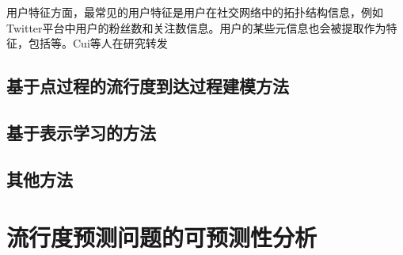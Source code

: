 用户特征方面，最常见的用户特征是用户在社交网络中的拓扑结构信息\citep{chen2005zhulu}，例如Twitter平台中用户的粉丝数和关注数信息。用户的某些元信息也会被提取作为特征，包括等。Cui等人\citep{chen2005zhulu}在研究转发
\subsection{基于点过程的流行度到达过程建模方法}
\subsection{基于表示学习的方法}
\subsection{其他方法}
\section{流行度预测问题的可预测性分析}

